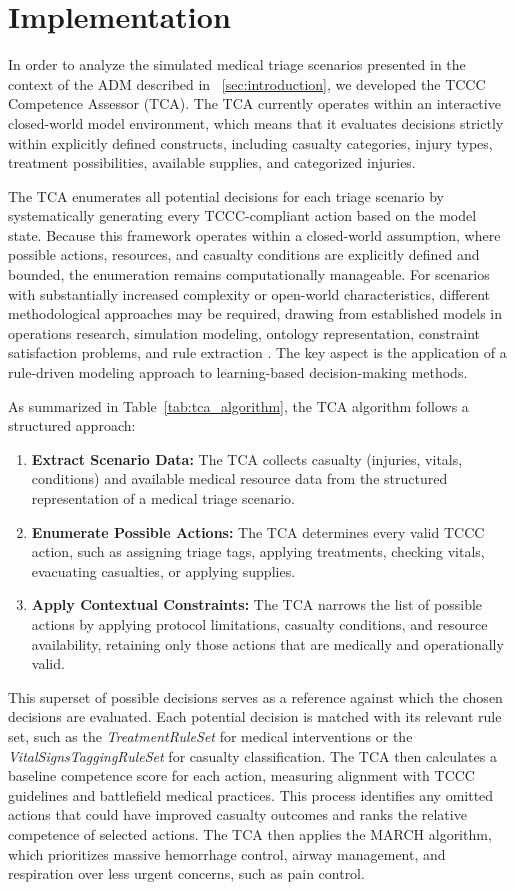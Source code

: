 \documentclass[conference]{IEEEtran}
\begin{document}
\section{Implementation}
\label{sec:implementation}
In order to analyze the simulated medical triage scenarios presented in the context of the ADM described in ~\ref{sec:introduction}, we developed the TCCC Competence Assessor (TCA). The TCA currently operates within an interactive closed-world model environment, which means that it evaluates decisions strictly within explicitly defined constructs, including casualty categories, injury types, treatment possibilities, available supplies, and categorized injuries.

The TCA enumerates all potential decisions for each triage scenario by systematically generating every TCCC-compliant action based on the model state. Because this framework operates within a closed-world assumption, where possible actions, resources, and casualty conditions are explicitly defined and bounded, the enumeration remains computationally manageable. For scenarios with substantially increased complexity or open-world characteristics, different methodological approaches may be required, drawing from established models in operations research, simulation modeling, ontology representation, constraint satisfaction problems, and rule extraction \cite{tolmeijer_implementations_2021}. The key aspect is the application of a rule-driven modeling approach to learning-based decision-making methods.

As summarized in Table~\ref{tab:tca_algorithm}, the TCA algorithm follows a structured approach:
\begin{enumerate}
\item \textbf{Extract Scenario Data:} The TCA collects casualty (injuries, vitals, conditions) and available medical resource data from the structured representation of a medical triage scenario.
\item \textbf{Enumerate Possible Actions:} The TCA determines every valid TCCC action, such as assigning triage tags, applying treatments, checking vitals, evacuating casualties, or applying supplies.
\item \textbf{Apply Contextual Constraints:} The TCA narrows the list of possible actions by applying protocol limitations, casualty conditions, and resource availability, retaining only those actions that are medically and operationally valid.
\end{enumerate}

This superset of possible decisions serves as a reference against which the chosen decisions are evaluated. Each potential decision is matched with its relevant rule set, such as the \textit{TreatmentRuleSet} for medical interventions or the \textit{VitalSignsTaggingRuleSet} for casualty classification. The TCA then calculates a baseline competence score for each action, measuring alignment with TCCC guidelines and battlefield medical practices. This process identifies any omitted actions that could have improved casualty outcomes and ranks the relative competence of selected actions. The TCA then applies the MARCH algorithm, which prioritizes massive hemorrhage control, airway management, and respiration over less urgent concerns, such as pain control.
\end{document}
